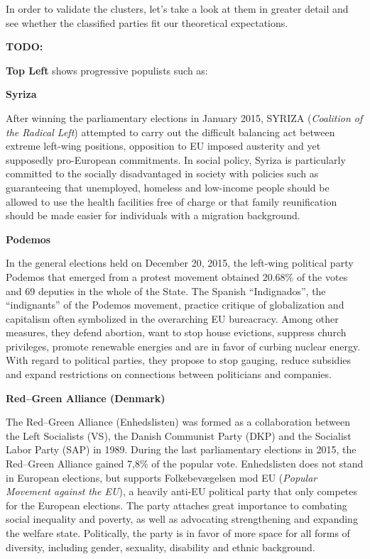 \documentclass[]{article}
\begin{document}
In order to validate the clusters, let's take a look at them in greater
detail and see whether the classified parties fit our theoretical
expectations.

\textbf{TODO:}

\textbf{Top Left} shows progressive populists such as:

\textbf{Syriza}

After winning the parliamentary elections in January 2015, SYRIZA
(\emph{Coalition of the Radical Left}) attempted to carry out the
difficult balancing act between extreme left-wing positions, opposition
to EU imposed austerity and yet supposedly pro-European commitments. In
social policy, Syriza is particularly committed to the socially
disadvantaged in society with policies such as guaranteeing that
unemployed, homeless and low-income people should be allowed to use the
health facilities free of charge or that family reunification should be
made easier for individuals with a migration background.

\textbf{Podemos}

In the general elections held on December 20, 2015, the left-wing
political party Podemos that emerged from a protest movement obtained
20.68\% of the votes and 69 deputies in the whole of the State. The
Spanish ``Indignados'', the ``indignants'' of the Podemos movement,
practice critique of globalization and capitalism often symbolized in
the overarching EU bureacracy. Among other measures, they defend
abortion, want to stop house evictions, suppress church privileges,
promote renewable energies and are in favor of curbing nuclear energy.
With regard to political parties, they propose to stop gauging, reduce
subsidies and expand restrictions on connections between politicians and
companies.

\textbf{Red--Green Alliance (Denmark)}

The Red--Green Alliance (Enhedslisten) was formed as a collaboration
between the Left Socialists (VS), the Danish Communist Party (DKP) and
the Socialist Labor Party (SAP) in 1989. During the last parliamentary
elections in 2015, the Red--Green Alliance gained 7,8\% of the popular
vote. Enhedslisten does not stand in European elections, but supports
Folkebevægelsen mod EU (\emph{Popular Movement against the EU}), a
heavily anti-EU political party that only competes for the European
elections. The party attaches great importance to combating social
inequality and poverty, as well as advocating strengthening and
expanding the welfare state. Politically, the party is in favor of more
space for all forms of diversity, including gender, sexuality,
disability and ethnic background.
\end{document}
